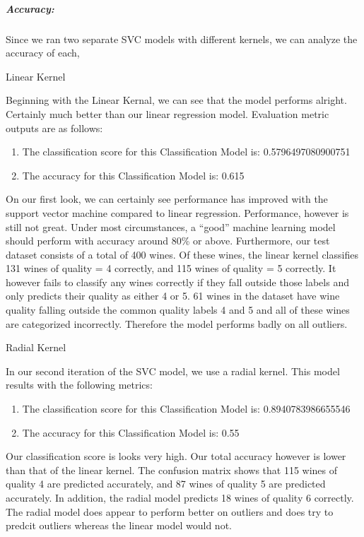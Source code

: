 \documentclass[11pt]{article}
\providecommand{\tightlist}{%
      \setlength{\itemsep}{0pt}\setlength{\parskip}{0pt}}
\begin{document}
\hypertarget{accuracy-2}{%
\subparagraph{Accuracy:}\label{accuracy-2}}

Since we ran two separate SVC models with different kernels, we can
analyze the accuracy of each,

Linear Kernel

Beginning with the Linear Kernal, we can see that the model performs
alright. Certainly much better than our linear regression model.
Evaluation metric outputs are as follows:

\begin{enumerate}
\def\labelenumi{\arabic{enumi}.}
\tightlist
\item
  The classification score for this Classification Model is:
  0.5796497080900751
\item
  The accuracy for this Classification Model is: 0.615
\end{enumerate}

On our first look, we can certainly see performance has improved with
the support vector machine compared to linear regression. Performance,
however is still not great. Under most circumstances, a ``good'' machine
learning model should perform with accuracy around 80\% or above.
Furthermore, our test dataset consists of a total of 400 wines. Of these
wines, the linear kernel classifies 131 wines of quality = 4 correctly,
and 115 wines of quality = 5 correctly. It however fails to classify any
wines correctly if they fall outside those labels and only predicts
their quality as either 4 or 5. 61 wines in the dataset have wine
quality falling outside the common quality labels 4 and 5 and all of
these wines are categorized incorrectly. Therefore the model performs
badly on all outliers.

Radial Kernel

In our second iteration of the SVC model, we use a radial kernel. This
model results with the following metrics:

\begin{enumerate}
\def\labelenumi{\arabic{enumi}.}
\tightlist
\item
  The classification score for this Classification Model is:
  0.8940783986655546
\item
  The accuracy for this Classification Model is: 0.55
\end{enumerate}

Our classification score is looks very high. Our total accuracy however
is lower than that of the linear kernel. The confusion matrix shows that
115 wines of quality 4 are predicted accurately, and 87 wines of quality
5 are predicted accurately. In addition, the radial model predicts 18
wines of quality 6 correctly. The radial model does appear to perform
better on outliers and does try to predcit outliers whereas the linear
model would not.
\end{document}
